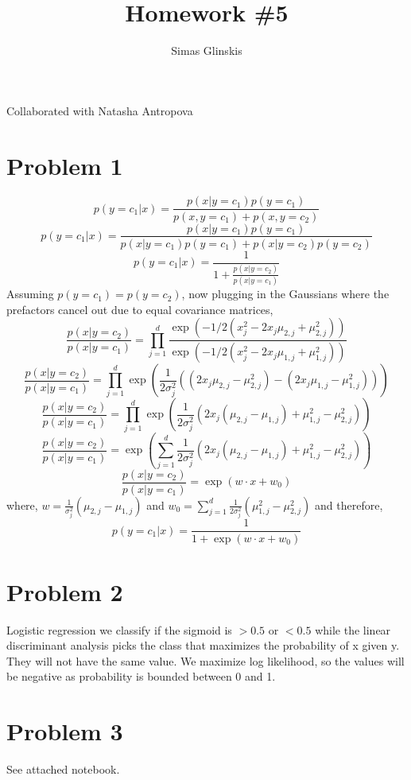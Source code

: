 \documentclass[]{article}
\title{Homework \#5}
\author{Simas Glinskis}
\begin{document}
\maketitle
Collaborated with Natasha Antropova
\section*{Problem 1}
\[
p(y=c_1|x) = \frac{p(x|y=c_1)p(y=c_1)}{p(x,y=c_1)+p(x,y=c_2)}
\]
\[
p(y=c_1|x) = \frac{p(x|y=c_1)p(y=c_1)}{p(x|y=c_1)p(y=c_1)+p(x|y=c_2)p(y=c_2)}
\]
\[
p(y=c_1|x) = \frac{1}{1+\frac{p(x|y=c_2)}{p(x|y=c_1)}}
\]
Assuming $p(y=c_1) = p(y=c_2)$, now plugging in the Gaussians where the prefactors cancel out due to equal covariance matrices,
\[
\frac{p(x|y=c_2)}{p(x|y=c_1)} = \prod_{j=1}^{d}\frac{\exp(-1/2(x_j^2 - 2x_j\mu_{2,j} + \mu_{2,j}^2))}{\exp(-1/2(x_j^2 - 2x_j\mu_{1,j} + \mu_{1,j}^2))}
\]
\[
\frac{p(x|y=c_2)}{p(x|y=c_1)} = \prod_{j=1}^{d}\exp(\frac{1}{2\sigma_j^2}((2x_j\mu_{2,j} - \mu_{2,j}^2)-(2x_j\mu_{1,j} - \mu_{1,j}^2)))
\]
\[
\frac{p(x|y=c_2)}{p(x|y=c_1)} = \prod_{j=1}^{d}\exp(\frac{1}{2\sigma_j^2}(2x_j(\mu_{2,j}-\mu_{1,j})+\mu_{1,j}^2-\mu_{2,j}^2))
\]
\[
\frac{p(x|y=c_2)}{p(x|y=c_1)} = \exp(\sum_{j=1}^{d}\frac{1}{2\sigma_j^2}(2x_j(\mu_{2,j}-\mu_{1,j})+\mu_{1,j}^2-\mu_{2,j}^2))
\]
\[
\frac{p(x|y=c_2)}{p(x|y=c_1)} = \exp(w\cdot x + w_0)
\]
where, $w=\frac{1}{\sigma_j^2}(\mu_{2,j}-\mu_{1,j})$ and $w_0 = \sum_{j=1}^{d}\frac{1}{2\sigma_j^2}(\mu_{1,j}^2-\mu_{2,j}^2)$ and therefore,
\[
p(y=c_1|x) = \frac{1}{1+\exp(w\cdot x + w_0)}
\]
\section*{Problem 2}
Logistic regression we classify if the sigmoid is $>0.5$ or $<0.5$ while the linear discriminant analysis picks the class that maximizes the probability of x given y. They will not have the same value. We maximize log likelihood, so the values will be negative as probability is bounded between 0 and 1.

\section*{Problem 3}
See attached notebook.
\end{document}
